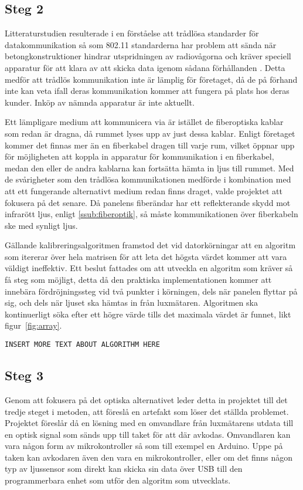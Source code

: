     \subsection{Steg 2} %
    \label{sub:steg_2}
        Litteraturstudien resulterade i en förståelse att trådlösa standarder för datakommunikation så som 802.11 standarderna har problem att sända när betongkonstruktioner hindrar utspridningen av radiovågorna och kräver speciell apparatur för att klara av att skicka data igenom sådana förhållanden \cite{11n}. Detta medför att trådlös kommunikation inte är lämplig för företaget, då de på förhand inte kan veta ifall deras kommunikation kommer att fungera på plats hos deras kunder. Inköp av nämnda apparatur är inte aktuellt. \bigskip

        Ett lämpligare medium att kommunicera via är istället de fiberoptiska kablar som redan är dragna, då rummet lyses upp av just dessa kablar. Enligt företaget kommer det finnas mer än en fiberkabel dragen till varje rum, vilket öppnar upp för möjligheten att koppla in apparatur för kommunikation i en fiberkabel, medan den eller de andra kablarna kan fortsätta hämta in ljus till rummet. Med de svårigheter som den trådlösa kommunikationen medförde i kombination med att ett fungerande alternativt medium redan finns draget, valde projektet att fokusera på det senare. Då panelens fiberändar har ett reflekterande skydd mot infrarött ljus, enligt \ref{ssub:fiberoptik}, så måste kommunikationen över fiberkabeln ske med synligt ljus. \bigskip

        Gällande kalibreringsalgoritmen framstod det vid datorkörningar att en algoritm som itererar över hela matrisen för att leta det högsta värdet kommer att vara väldigt ineffektiv. Ett beslut fattades om att utveckla en algoritm som kräver så få steg som möjligt, detta då den praktiska implementationen kommer att innebära fördröjningssteg vid två punkter i körningen, dels när panelen flyttar på sig, och dels när ljuset ska hämtas in från luxmätaren. Algoritmen ska kontinuerligt söka efter ett högre värde tills det maximala värdet är funnet, likt figur~\ref{fig:array}.

        \texttt{INSERT MORE TEXT ABOUT ALGORITHM HERE} \bigskip


    \subsection{Steg 3} %
    \label{sub:steg_3}
        Genom att fokusera på det optiska alternativet leder detta in projektet till det tredje steget i metoden, att föreslå en artefakt som löser det ställda problemet. Projektet föreslår då en lösning med en omvandlare från luxmätarens utdata till en optisk signal som sänds upp till taket för att där avkodas. Omvandlaren kan vara någon form av mikrokontroller så som till exempel en Arduino. Uppe på taken kan avkodaren även den vara en mikrokontroller, eller om det finns någon typ av ljussensor som direkt kan skicka sin data över USB till den programmerbara enhet som utför den algoritm som utvecklats. \bigskip

